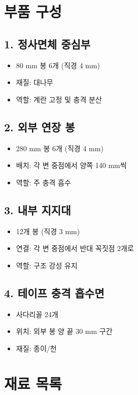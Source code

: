 \documentclass[a4paper,12pt]{article}
\begin{document}
\begin{CJK}{UTF8}{mj}
\section{부품 구성}

\subsection{1. 정사면체 중심부}
\begin{itemize}
    \item 80 mm 봉 6개 (직경 4 mm)
    \item 재질: 대나무
    \item 역할: 계란 고정 및 충격 분산
\end{itemize}

\subsection{2. 외부 연장 봉}
\begin{itemize}
    \item 280 mm 봉 6개 (직경 4 mm)
    \item 배치: 각 변 중점에서 양쪽 140 mm씩
    \item 역할: 주 충격 흡수
\end{itemize}

\subsection{3. 내부 지지대}
\begin{itemize}
    \item 12개 봉 (직경 3 mm)
    \item 연결: 각 변 중점에서 반대 꼭짓점 2개로
    \item 역할: 구조 강성 유지
\end{itemize}

\subsection{4. 테이프 충격 흡수면}
\begin{itemize}
    \item 사다리꼴 24개
    \item 위치: 외부 봉 양 끝 30 mm 구간
    \item 재질: 종이/천
\end{itemize}

\section{재료 목록}


\end{CJK}
\end{document}

